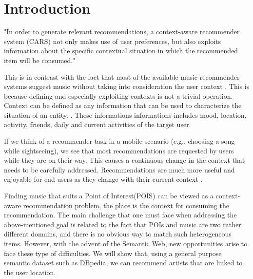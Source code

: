 \documentclass[paper=a4, fontsize=11pt]{scrartcl}
\begin{document}
\tableofcontents
\newpage

\section{Introduction}
"In order to generate relevant recommendations, a context-aware recommender system (CARS) not only makes use of user preferences, but also exploits information about the specific contextual situation in which the recommended item will be consumed." \cite{Baltrunas:2012:CRA:2339097.2339111}

This is in contrast with the fact that most of the available music recommender systems suggest music without taking into consideration the user context \cite{Knees:2013:SMS:2559928.2542206}. This is because defining and especially exploiting contexts is not a trivial operation. Context can be defined as any information that can be used to characterize the situation of an entity. \cite{Dey:2001:UUC:593570.593572}. These informations informations includes mood, location, activity, friends, daily and current activities of the target user.

If we think of a recommender task in a mobile scenario (e.g., choosing a song while sightseeing), we see that most recommendations are requested by users while they are on their way. This causes a continuous change in the context that needs to be carefully addressed. Recommendations are much more useful and enjoyable for end users as they change with their current context . \cite{Ostuni:2012:CCM:2887638.2887642}

Finding music that suits a Point of Interest(POIS) can be viewed as a context-aware recommendation problem, the place is the context for consuming the recommendation. The main challenge that one must face when addressing the above-mentioned goal is related to the fact that POIs and music are two rather different domains, and there is no obvious way to match such heterogeneous items. However, with the advent of the Semantic Web, new opportunities arise to face these type of difficulties. We will show that, using a general purpose semantic dataset such as DBpedia, we can recommend artists that are linked to the user location.
\end{document}
